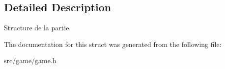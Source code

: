 \subsection{Detailed Description}
Structure de la partie. 

The documentation for this struct was generated from the following file\+:\begin{DoxyCompactItemize}
\item 
src/game/game.\+h\end{DoxyCompactItemize}
